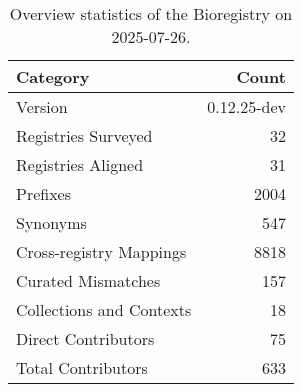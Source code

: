 \begin{table}
\caption{Overview statistics of the Bioregistry on 2025-07-26.}
\label{tab:bioregistry-summary}
\begin{tabular}{lr}
\toprule
Category & Count \\
\midrule
Version & 0.12.25-dev \\
Registries Surveyed & 32 \\
Registries Aligned & 31 \\
Prefixes & 2004 \\
Synonyms & 547 \\
Cross-registry Mappings & 8818 \\
Curated Mismatches & 157 \\
Collections and Contexts & 18 \\
Direct Contributors & 75 \\
Total Contributors & 633 \\
\bottomrule
\end{tabular}
\end{table}
